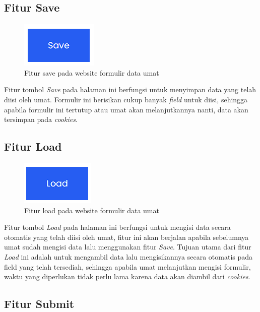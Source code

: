 \newpage

\subsection{Fitur Save}

\begin{figure}[H]
	\centering
	\includegraphics[scale=0.7]{Gambar/fiturSave.png}
	\caption{Fitur save pada website formulir data umat} 
	\label{fig:fiturSave}
\end{figure}

Fitur tombol \textit{Save} pada halaman ini berfungsi untuk menyimpan data yang telah diisi oleh umat. Formulir ini berisikan cukup banyak \textit{field} untuk diisi, sehingga apabila formulir ini tertutup atau umat akan melanjutkannya nanti, data akan tersimpan pada \textit{cookies}.

\subsection{Fitur Load}

\begin{figure}[H]
	\centering
	\includegraphics[scale=0.7]{Gambar/fiturLoad.png}
	\caption{Fitur load pada website formulir data umat} 
	\label{fig:fiturLoad}
\end{figure}

Fitur tombol \textit{Load} pada halaman ini berfungsi untuk mengisi data secara otomatis yang telah diisi oleh umat, fitur ini akan berjalan apabila sebelumnya umat sudah mengisi data lalu menggunakan fitur \textit{Save}. Tujuan utama dari fitur \textit{Load} ini adalah untuk mengambil data lalu mengisikannya secara otomatis pada field yang telah tersediah, sehingga apabila umat melanjutkan mengisi formulir, waktu yang diperlukan tidak perlu lama karena data akan diambil dari \textit{cookies}.

\subsection{Fitur Submit}

